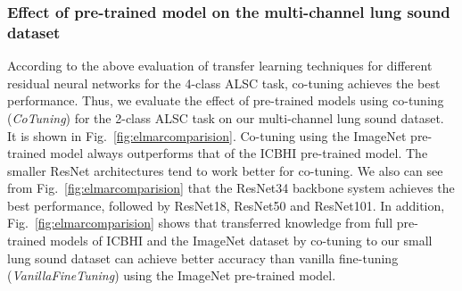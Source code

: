 \documentclass[journal]{IEEEtran}
\begin{document}
\begin{table}[t]
    \renewcommand{\arraystretch}{1.3}
    \caption{Comparison between the proposed systems and the system in~\cite{nguyen2021crackle} using our multi-channel lung sound dataset for crackle detection task}
    \label{comparisonours}
    \centering
\end{table} 

\subsubsection{Effect of pre-trained model on the multi-channel lung sound dataset}
According to the above evaluation of transfer learning techniques for  different residual neural networks for the 4-class ALSC task, co-tuning achieves the best performance. Thus, we evaluate the effect of pre-trained models using co-tuning (\textit{CoTuning}) for the 2-class ALSC task on our multi-channel lung sound dataset. It is shown in Fig.~\ref{fig:elmarcomparision}. Co-tuning using the ImageNet pre-trained model always outperforms that of the ICBHI pre-trained model. The smaller ResNet architectures tend to work better for co-tuning. We also can see from Fig.~\ref{fig:elmarcomparision} that the ResNet34 backbone system achieves the best performance, followed by ResNet18, ResNet50 and ResNet101. In addition, Fig.~\ref{fig:elmarcomparision}  shows that transferred knowledge from full pre-trained models of ICBHI and the ImageNet dataset by co-tuning to our small lung sound dataset can achieve better accuracy than vanilla fine-tuning (\textit{VanillaFineTuning}) using the ImageNet pre-trained model.\break
\end{document}
